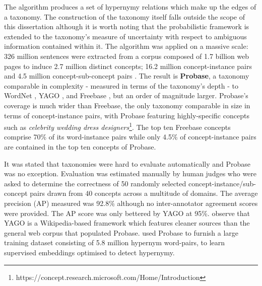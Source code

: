 The algorithm produces a set of hypernymy relations which make up the edges of a taxonomy.  The construction of the taxonomy itself falls outside the scope of this dissertation although it is worth noting that the probabilistic framework is extended to the taxonomy’s measure of uncertainty with respect to ambiguous information contained within it.  The algorithm was applied on a massive scale:  326 million sentences were extracted from a corpus composed of 1.7 billion web pages to induce 2.7 million distinct concepts; 16.2 million concept-instance pairs and 4.5 million concept-sub-concept pairs \citep{wu2012probase}.  The result is \textbf{Probase}, a taxonomy comparable in complexity  - measured in terms of the taxonomy’s depth - to WordNet \citep{Miller1995}, YAGO \citep{suchanek2007yago}, and Freebase \citep{bollacker2008freebase}, but an order of magnitude larger.  Probase’s coverage is much wider than Freebase, the only taxonomy comparable in size in terms of concept-instance pairs, with Probase featuring highly-specific concepts such as \textit{celebrity wedding dress designers}\footnote{https://concept.research.microsoft.com/Home/Introduction}.  The top ten Freebase concepts comprise 70\% of its word-instance pairs while only 4.5\% of concept-instance pairs are contained in the top ten concepts of Probase.

It was stated that taxonomies were hard to evaluate automatically \citep{camacho2017we} and Probase was no exception.  Evaluation was estimated manually by human judges who were asked to determine the correctness of 50 randomly selected concept-instance/sub-concept pairs drawn from 40 concepts across a multitude of domains.  The average precision (AP) measured was 92.8\% although no inter-annotator agreement scores were provided.  The AP score was only bettered by YAGO \citep{suchanek2007yago} at 95\%.  \citet{wu2012probase} observe that YAGO is a Wikipedia-based framework which features cleaner sources than the general web corpus that populated Probase.  \citet{yu2015learning} used Probase to furnish a large training dataset consisting of 5.8 million hypernym word-pairs, to learn supervised embeddings optimised to detect hypernymy.

